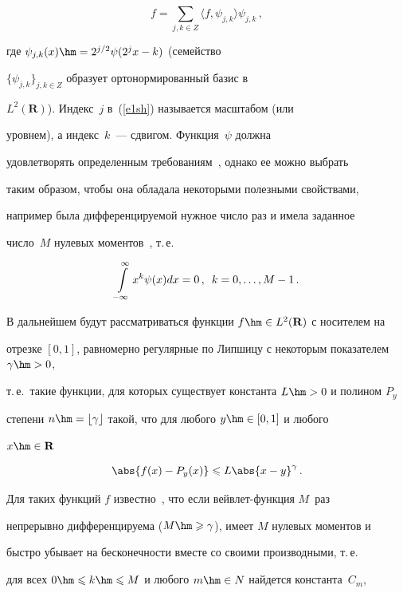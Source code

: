 \noindent

\begin{equation}

f=\sum_{j,k\in Z}\langle f,\psi_{j,k}\rangle\psi_{j,k}\,,\label{e1sh}

\end{equation}

где $\psi_{j,k}(x)\hm=2^{j/2}\psi(2^jx-k)$ (семейство

$\{\psi_{j,k}\}_{j,k\in Z}$ образует ортонормированный базис в

$L^2(\mathbf{R})$). Индекс~$j$ в~(\ref{e1sh}) называется масштабом (или

уровнем), а индекс~$k$~--- сдвигом. Функция~$\psi$ должна

удовлетворять определенным требованиям~\cite{10sh}, однако ее можно выбрать

таким образом, чтобы она обладала некоторыми полезными свойствами,

например была дифференцируемой нужное число раз и имела заданное

число~$M$ нулевых моментов~\cite{10sh}, т.\,е.\

$$

\int\limits_{-\infty}^{\infty}x^k\psi(x)dx=0\,,\enskip k=0,\ldots,M-1\,.

$$



В дальнейшем будут рассматриваться функции $f\hm\in L^2(\mathbf{R})$ с носителем на 

отрезке $[0,1]$, равномерно регулярные по Липшицу с некоторым показателем $\gamma\hm>0$, 

т.\,е.\ такие функции, для которых существует константа $L\hm>0$ и полином $P_y$ 

степени $n\hm=\lfloor\gamma\rfloor$ такой, что для любого $y\hm\in[0,1]$ и любого 

$x\hm\in\mathbf{R}$

$$

\abs{f(x)-P_y(x)}\leqslant L\abs{x-y}^\gamma\,.

$$



Для таких функций $f$ известно~\cite{11sh}, что если вейв\-лет-функ\-ция $M$~раз 

непрерывно дифференцируема ($M\hm\geqslant\gamma$), имеет $M$ нулевых моментов и 

быст\-ро убывает на бесконечности вместе со своими производными, т.\,е.\ 

для всех $0\hm\leqslant k \hm\leqslant M$ и любого $m\hm\in N$ найдется константа~$C_m$, 

